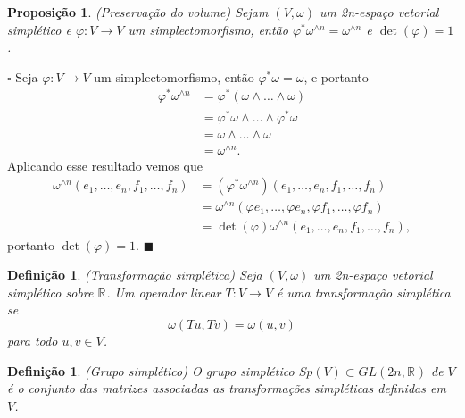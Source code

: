 \documentclass[12pt]{book}
\newtheorem{definicao}[teorema]{Definição}
\newtheorem{proposicao}[teorema]{Proposição}
\newenvironment{prova}[1]{$\square$ #1}{\hfill$\blacksquare$}
\newcommand{\formaSimpletica}[2]{\omega(#1, #2)}
\newcommand{\generalgroup}[2]{GL(#1, #2)}
\newcommand{\generalgroupreal}[1]{\generalgroup{#1}{\real{}}}
\newcommand{\gruposimpletico}[1]{Sp(#1)}
\newcommand{\real}[1]{\mathbb{R}^{#1}}
\newcommand{\reta}{\real{}}
\begin{document}
	\begin{proposicao}\label{proposicao_preservacao_volume}
		(Preservação do volume) Sejam $(V,\omega)$ um 2n-espaço vetorial simplético e $\varphi:V\to V$ um simplectomorfismo, então $\varphi^{*}\omega^{\wedge n}=\omega^{\wedge n}$ e $\det(\varphi)=1$.
	\end{proposicao}
	\begin{prova}
		Seja $\varphi:V \to V$ um simplectomorfismo, então $\varphi^{*}\omega = \omega$, e portanto
		$$
		\begin{aligned}
		\varphi^{*}\omega^{\wedge n} 
		&= 
		\varphi^{*}(\omega\wedge \dots \wedge\omega) 
		\\
		&= \varphi^{*}\omega\wedge \dots \wedge\varphi^{*}\omega
		\\
		&=\omega\wedge \dots \wedge \omega 
		\\
		&= \omega^{\wedge n}.
		\end{aligned} 
		$$
		Aplicando esse resultado vemos que
		$$
		\begin{aligned}
		\omega^{\wedge n}(e_{1}, \dots,e_{n}, f_{1},\dots, f_{n})
		&=(\varphi^{*}\omega^{\wedge n})(e_{1}, \dots, e_{n}, f_{1},\dots, f_{n})
		\\
		&=
		\omega^{\wedge n}(\varphi e_{1}, \dots,\varphi  e_{n}, \varphi f_{1},\dots, \varphi f_{n})
		\\
		&=\det(\varphi)\omega^{\wedge n}(e_{1}, \dots, e_{n}, f_{1},\dots, f_{n}),
		\end{aligned}
		$$
		portanto $\det(\varphi) = 1$.
	\end{prova}
	
	
	\begin{definicao}\label{definicao_transformacao_simpletica}
		(Transformação simplética) Seja $(V, \omega)$ um 2n-espaço vetorial simplético sobre $\reta$. Um operador linear $T: V \to V$ é uma transformação simplética se 
		$$
		\formaSimpletica{Tu}{Tv} = \formaSimpletica{u}{v}
		$$ para todo $u,v\in V$.
	\end{definicao}
	
	\begin{definicao}\label{definicao_grupo_simpletico}
		(Grupo simplético) O grupo simplético $\gruposimpletico{V} \subset \generalgroupreal{2n}$ de $V$ é o conjunto das matrizes associadas as transformações simpléticas definidas em $V$.
	\end{definicao}
	
\end{document}
